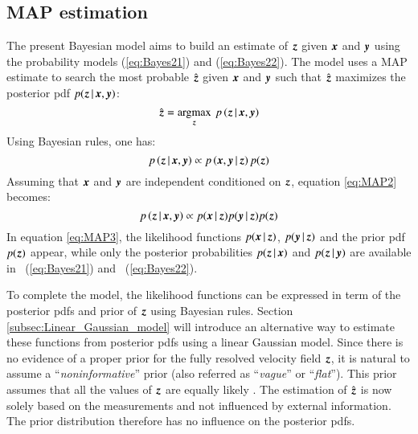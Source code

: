 \subsection{\label{subsec:MAP_estimation} MAP estimation}
The present Bayesian model aims to build an estimate of $ \operatorname{\boldsymbol{z}}  $ given $ \operatorname{\boldsymbol{x}}  $ and $ \operatorname{\boldsymbol{y}}  $ using the probability models (\ref{eq:Bayes21}) and (\ref{eq:Bayes22}). The model uses a MAP estimate to search the most probable $ \hat{\operatorname{\boldsymbol{z}} } $ given $ \operatorname{\boldsymbol{x}} $ and $ \operatorname{\boldsymbol{y}}  $ such that $ \hat{\operatorname{\boldsymbol{z}} } $ maximizes the posterior pdf $ p(\operatorname{\boldsymbol{z}} |\operatorname{\boldsymbol{x}} ,\operatorname{\boldsymbol{y}} ) $:
\begin{equation}
 \hat{\z }=\argmax_{\z } \:  p \left(\z |\x ,\y \right)
 \label{eq:MAP1}
\end{equation}
Using Bayesian rules, one has:
\begin{equation}
p\left(\z |\x ,\y \right) \propto p\left(\x ,\y |\z  \right)p(\z )
 \label{eq:MAP2}
\end{equation}
Assuming that $ \operatorname{\boldsymbol{x}}  $ and $ \operatorname{\boldsymbol{y}}  $ are independent conditioned on $ \operatorname{\boldsymbol{z}}  $, equation \ref{eq:MAP2} becomes:
\begin{equation}
p\left(\z |\x ,\y \right) \propto p(\x |\z )p(\y |\z )p(\z )
\label{eq:MAP3}
\end{equation}
In equation \ref{eq:MAP3}, the likelihood functions $ p(\operatorname{\boldsymbol{x}} |\operatorname{\boldsymbol{z}} ) $, $ p(\operatorname{\boldsymbol{y}} |\operatorname{\boldsymbol{z}} ) $ and the prior pdf $ p(\operatorname{\boldsymbol{z}} ) $ appear, while only the posterior probabilities $ p(\operatorname{\boldsymbol{z}} |\operatorname{\boldsymbol{x}} ) $ and $ p(\operatorname{\boldsymbol{z}} |\operatorname{\boldsymbol{y}} ) $ are available in ~(\ref{eq:Bayes21}) and ~(\ref{eq:Bayes22}). 

To complete the model, the likelihood functions can be expressed in term of the posterior pdfs and prior of $ \operatorname{\boldsymbol{z}}  $ using Bayesian rules. Section \ref{subsec:Linear_Gaussian_model} will introduce an alternative way to estimate these functions from posterior pdfs using a linear Gaussian model. Since there is no evidence of a proper prior for the fully resolved velocity field $ \operatorname{\boldsymbol{z}} $, it is natural to assume a ``\textit{noninformative}'' prior (also referred as ``\textit{vague}'' or ``\textit{flat}''). This prior assumes that all the values of $ \operatorname{\boldsymbol{z}}  $ are equally likely \citep{gelman2014bayesian}. The estimation of $ \hat{\operatorname{\boldsymbol{z}} } $ is now solely based on the measurements and not influenced by external information. The prior distribution therefore has no influence on the posterior pdfs.

